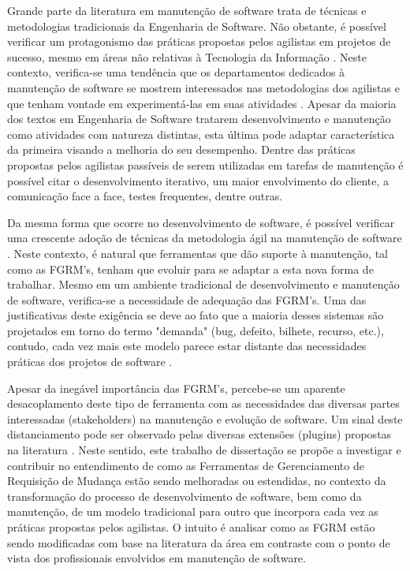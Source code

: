\documentclass[msc,proposal,hidelot,hideabstract]{ppgccufmg} %
\begin{document}
Grande parte da literatura em manutenção de software trata de técnicas e metodologias tradicionais da Engenharia de Software. Não obstante, é possível verificar um protagonismo das práticas propostas pelos agilistas em projetos de sucesso, mesmo em áreas não relativas à Tecnologia da Informação \cite{Serrador2015}. Neste contexto, verifica-se uma tendência que os departamentos dedicados à manutenção de software se mostrem interessados nas metodologias dos agilistas e que tenham vontade em experimentá-las em suas atividades \cite{Heeager2015}. Apesar da maioria dos textos em Engenharia de Software tratarem desenvolvimento e manutenção como atividades com natureza distintas, esta última pode adaptar característica da primeira visando a melhoria do seu desempenho. Dentre das práticas propostas pelos agilistas passíveis de serem utilizadas em tarefas de manutenção é possível citar o desenvolvimento iterativo, um maior envolvimento do cliente, a comunicação face a face, testes frequentes, dentre outras.



Da mesma forma que ocorre no desenvolvimento de software, é possível verificar uma crescente adoção de técnicas da metodologia ágil na manutenção de software \cite{Soltan2016,Devulapally2015, Heeager2015}. Neste contexto, é natural que ferramentas que dão suporte à manutenção, tal como as FGRM's, tenham que evoluir para se adaptar a esta nova forma de trabalhar. Mesmo em um ambiente tradicional de  desenvolvimento e manutenção de software, verifica-se a necessidade de adequação das FGRM's. Uma das justificativas deste exigência se deve ao fato que a maioria desses sistemas são projetados em torno do termo "demanda" (bug, defeito, bilhete, recurso, etc.), contudo, cada vez mais este modelo parece estar distante das necessidades práticas dos projetos de software \cite{Baysal:2013:SAP:2486788.2486957}.


Apesar da inegável importância das FGRM's, percebe-se um aparente desacoplamento deste tipo de ferramenta com as necessidades das diversas partes interessadas (stakeholders) na manutenção e evolução de software. Um sinal deste distanciamento pode ser observado pelas diversas extensões (plugins) propostas na literatura \cite{101186,Thung:2014:BIT:2635868.2661678,Kononenko:2014:DED:2591062.2591075}. Neste sentido, este trabalho de dissertação se propõe a investigar e contribuir no entendimento de como as Ferramentas de Gerenciamento de Requisição de Mudança estão sendo melhoradas ou estendidas, no contexto da transformação do processo de desenvolvimento de software, bem como da manutenção, de um modelo tradicional para outro que incorpora cada vez as práticas propostas pelos agilistas. O intuito é analisar como as FGRM estão sendo modificadas com base na literatura da área em contraste com o ponto de vista dos profissionais envolvidos em manutenção de software.
 
\end{document}
